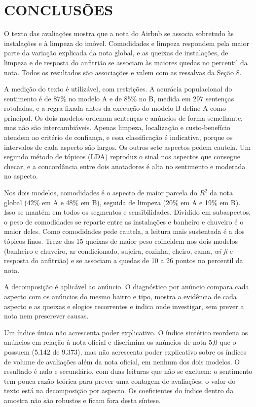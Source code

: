 \section{CONCLUSÕES}

O texto das avaliações mostra que a nota do Airbnb se associa sobretudo às instalações e à limpeza do imóvel. Comodidades e limpeza respondem pela maior parte da variação explicada da nota global, e as queixas de instalações, de limpeza e de resposta do anfitrião se associam às maiores quedas no percentil da nota. Todos os resultados são associações e valem com as ressalvas da Seção 8.

A medição do texto é utilizável, com restrições. A acurácia populacional do sentimento é de 87\% no modelo A e de 85\% no B, medida em 297 sentenças rotuladas, e a regra fixada antes da execução do modelo B define A como principal. Os dois modelos ordenam sentenças e anúncios de forma semelhante, mas não são intercambiáveis. Apenas limpeza, localização e custo-benefício atendem ao critério de confiança, e essa classificação é indicativa, porque os intervalos de cada aspecto são largos. Os outros sete aspectos pedem cautela. Um segundo método de tópicos (LDA) reproduz o sinal nos aspectos que consegue checar, e a concordância entre dois anotadores é alta no sentimento e moderada no aspecto.

Nos dois modelos, comodidades é o aspecto de maior parcela do $R^2$ da nota global (42\% em A e 48\% em B), seguida de limpeza (20\% em A e 19\% em B). Isso se mantém em todos os segmentos e sensibilidades. Dividido em subaspectos, o peso de comodidades se reparte entre as instalações e banheiro e chuveiro é o maior deles. Como comodidades pede cautela, a leitura mais sustentada é a dos tópicos finos. Treze das 15 queixas de maior peso coincidem nos dois modelos (banheiro e chuveiro, ar-condicionado, sujeira, cozinha, cheiro, cama, \textit{wi-fi} e resposta do anfitrião) e se associam a quedas de 10 a 26 pontos no percentil da nota.

A decomposição é aplicável ao anúncio. O diagnóstico por anúncio compara cada aspecto com os anúncios do mesmo bairro e tipo, mostra a evidência de cada aspecto e as queixas e elogios recorrentes e indica onde investigar, sem prever a nota nem prescrever causas.

Um índice único não acrescenta poder explicativo. O índice sintético reordena os anúncios em relação à nota oficial e discrimina os anúncios de nota 5,0 que o possuem (5.142 de 9.373), mas não acrescenta poder explicativo sobre os índices de volume de avaliações além da nota oficial, em nenhum dos dois modelos. O resultado é nulo e secundário, com duas leituras que não se excluem: o sentimento tem pouca razão teórica para prever uma contagem de avaliações; o valor do texto está na decomposição por aspecto. Os coeficientes do índice dentro da amostra não são robustos e ficam fora desta síntese.

